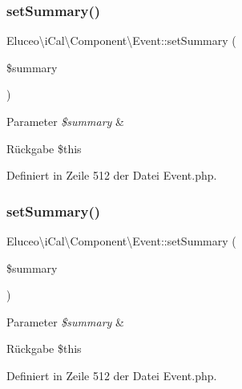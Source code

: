 \subsubsection{\texorpdfstring{set\+Summary()}{setSummary()}\hspace{0.1cm}{\footnotesize\ttfamily [1/3]}}
{\footnotesize\ttfamily Eluceo\textbackslash{}i\+Cal\textbackslash{}\+Component\textbackslash{}\+Event\+::set\+Summary (\begin{DoxyParamCaption}\item[{}]{\$summary }\end{DoxyParamCaption})}


\begin{DoxyParams}{Parameter}
{\em \$summary} & \\
\hline
\end{DoxyParams}
\begin{DoxyReturn}{Rückgabe}
\$this 
\end{DoxyReturn}


Definiert in Zeile 512 der Datei Event.\+php.

\mbox{\label{class_eluceo_1_1i_cal_1_1_component_1_1_event_ad632fd01f9c5094a1e705c21fc1dddf1}} 
\subsubsection{\texorpdfstring{set\+Summary()}{setSummary()}\hspace{0.1cm}{\footnotesize\ttfamily [2/3]}}
{\footnotesize\ttfamily Eluceo\textbackslash{}i\+Cal\textbackslash{}\+Component\textbackslash{}\+Event\+::set\+Summary (\begin{DoxyParamCaption}\item[{}]{\$summary }\end{DoxyParamCaption})}


\begin{DoxyParams}{Parameter}
{\em \$summary} & \\
\hline
\end{DoxyParams}
\begin{DoxyReturn}{Rückgabe}
\$this 
\end{DoxyReturn}


Definiert in Zeile 512 der Datei Event.\+php.

